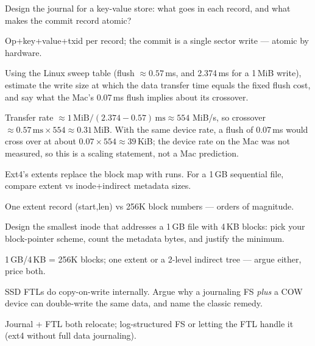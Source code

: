 \begin{exercise}[medium]
Design the journal for a key-value store: what goes in each
record, and what makes the commit record atomic?
\end{exercise}
\begin{solution}[hint]
Op+key+value+txid per record; the commit is a single sector
write --- atomic by hardware.
\end{solution}

\begin{exercise}[medium]
Using the Linux sweep table (flush $\approx0.57$\,ms, and
2.374\,ms for a 1\,MiB write), estimate the write size at which the
data transfer time equals the fixed flush cost, and say what the
Mac's 0.07\,ms flush implies about its crossover.
\end{exercise}
\begin{solution}[hint]
Transfer rate $\approx1\,\text{MiB}/(2.374-0.57)\,\text{ms}\approx554$
MiB/s, so crossover $\approx0.57\,\text{ms}\times554\approx0.31$\,MiB.
With the same device rate, a flush of 0.07\,ms would cross over at
about $0.07\times554\approx39$\,KiB; the device rate on the Mac was
not measured, so this is a scaling statement, not a Mac prediction.
\end{solution}

\begin{exercise}[medium]
Ext4's extents replace the block map with runs. For a 1\,GB
sequential file, compare extent vs inode+indirect metadata sizes.
\end{exercise}
\begin{solution}[hint]
One extent record (start,len) vs 256K block numbers --- orders
of magnitude.
\end{solution}

\begin{exercise}[hard]
Design the smallest inode that addresses a 1\,GB file with 4\,KB
blocks: pick your block-pointer scheme, count the metadata bytes,
and justify the minimum.
\end{exercise}
\begin{solution}[hint]
1\,GB/4\,KB = 256K blocks; one extent or a 2-level indirect tree
--- argue either, price both.
\end{solution}

\begin{exercise}[hard]
SSD FTLs do copy-on-write internally. Argue why a journaling FS
\emph{plus} a COW device can double-write the same data, and
name the classic remedy.
\end{exercise}
\begin{solution}[hint]
Journal + FTL both relocate; log-structured FS or letting the
FTL handle it (ext4 without full data journaling).
\end{solution}

